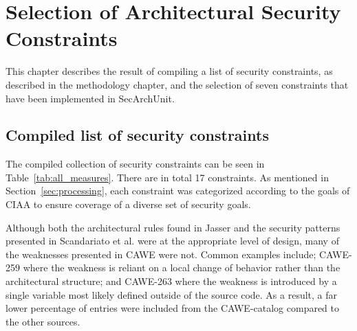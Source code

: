 \chapter{Selection of Architectural Security Constraints}

This chapter describes the result of compiling a list of security constraints, as described in the methodology chapter, and the selection of seven constraints that have been implemented in SecArchUnit.  

\section{Compiled list of security constraints}

The compiled collection of security constraints can be seen in Table~\ref{tab:all_measures}. There are in total 17 constraints. As mentioned in Section~\ref{sec:processing}, each constraint was categorized according to the goals of CIAA to ensure coverage of a diverse set of security goals. 

Although both the architectural rules found in Jasser \cite{franch_constraining_2019} and the security patterns presented in Scandariato et al. \cite{scandariato_system_2006} were at the appropriate level of design, many of the weaknesses presented in CAWE were not. Common examples include; CAWE-259  where the weakness is reliant on a local change of behavior rather than the architectural structure; and CAWE-263  where the weakness is introduced by a single variable most likely defined outside of the source code. As a result, a far lower percentage of entries were included from the CAWE-catalog compared to the other sources.




